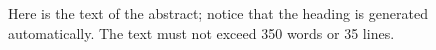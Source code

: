 Here is the text of the abstract;
notice that the heading is generated automatically.
The text must not exceed 350 words or 35 lines.


